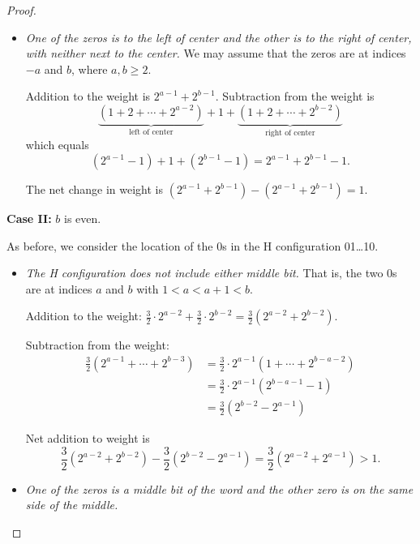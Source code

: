 \documentclass[12pt]{article}
\begin{document}
\begin{proof}
\begin{itemize}
    \item \emph{One of the zeros is to the left of center and the
        other is to the right of center, with neither next to the
        center.} We may assume that the zeros are at indices $-a$ and
      $b$, where $a,b\ge2$.

      Addition to the weight is $2^{a-1}+2^{b-1}$. Subtraction from
      the weight is
      \[
      \underbrace{
        \left(1+2+\cdots+2^{a-2}
        \right)
      }_{\text{left of center}} + 1 + 
      \underbrace{
        \left(1+2+\cdots+2^{b-2}
        \right)
      }_{\text{right of center}}
      \]
      which equals 
      \[
      \left(2^{a-1}-1 \right) + 1 + \left(2^{b-1}-1\right) = 2^{a-1}+2^{b-1}-1.
      \]

      The net change in weight is $\left(2^{a-1}+2^{b-1}\right) - 
      \left(2^{a-1}+2^{b-1}\right) = 1$. 
  \end{itemize}

  
  

  \noindent\textbf{Case II:} $b$ is even.

  As before, we consider the location of the 0s in the H configuration
  01\ldots10. 

  \begin{itemize}
  \item \emph{The H configuration does not include either middle bit.}
    That is, the two 0s are at indices $a$ and $b$ with $1<a<a+1<b$. 

    Addition to the weight: $\frac32\cdot 2^{a-2}+ \frac32\cdot
    2^{b-2}=\frac32(2^{a-2}+2^{b-2})$. 

    Subtraction from the weight:
    \[
    \begin{aligned}
      \frac32\left(2^{a-1}+\cdots+2^{b-3}\right) &=
      \frac32\cdot2^{a-1}\left(1+\cdots+2^{b-a-2}\right) \\
      &=
      \frac32\cdot 2^{a-1}\left(2^{b-a-1}-1\right) \\
      &=
      \frac32\left(2^{b-2}-2^{a-1}\right)
    \end{aligned}
    \]

    Net addition to weight is
    \[
    \frac32\left(2^{a-2}+2^{b-2}\right)
    - 
    \frac32\left(2^{b-2}-2^{a-1}\right) = 
    \frac32\left(2^{a-2}+2^{a-1}\right)
    > 1.
    \]

  \item \emph{One of the zeros is a middle bit of the word and the
      other zero is on the same side of the middle.}  


\end{itemize}
\end{proof}
\end{document}
